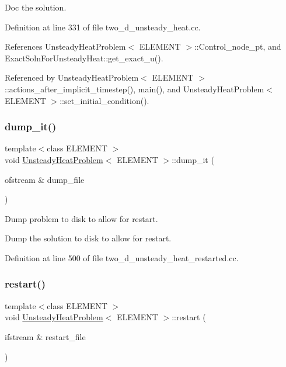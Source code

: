 Doc the solution. 



Definition at line 331 of file two\+\_\+d\+\_\+unsteady\+\_\+heat.\+cc.



References Unsteady\+Heat\+Problem$<$ E\+L\+E\+M\+E\+N\+T $>$\+::\+Control\+\_\+node\+\_\+pt, and Exact\+Soln\+For\+Unsteady\+Heat\+::get\+\_\+exact\+\_\+u().



Referenced by Unsteady\+Heat\+Problem$<$ E\+L\+E\+M\+E\+N\+T $>$\+::actions\+\_\+after\+\_\+implicit\+\_\+timestep(), main(), and Unsteady\+Heat\+Problem$<$ E\+L\+E\+M\+E\+N\+T $>$\+::set\+\_\+initial\+\_\+condition().

\mbox{\label{classUnsteadyHeatProblem_a9a60874a6471414819301705f1a2afd1}} 
\subsubsection{\texorpdfstring{dump\+\_\+it()}{dump\_it()}}
{\footnotesize\ttfamily template$<$class E\+L\+E\+M\+E\+NT $>$ \\
void \hyperlink{classUnsteadyHeatProblem}{Unsteady\+Heat\+Problem}$<$ E\+L\+E\+M\+E\+NT $>$\+::dump\+\_\+it (\begin{DoxyParamCaption}\item[{ofstream \&}]{dump\+\_\+file }\end{DoxyParamCaption})}



Dump problem to disk to allow for restart. 

Dump the solution to disk to allow for restart. 

Definition at line 500 of file two\+\_\+d\+\_\+unsteady\+\_\+heat\+\_\+restarted.\+cc.

\mbox{\label{classUnsteadyHeatProblem_ad0a4a1c1da24f6d62f64b0d40be31709}} 
\subsubsection{\texorpdfstring{restart()}{restart()}}
{\footnotesize\ttfamily template$<$class E\+L\+E\+M\+E\+NT $>$ \\
void \hyperlink{classUnsteadyHeatProblem}{Unsteady\+Heat\+Problem}$<$ E\+L\+E\+M\+E\+NT $>$\+::restart (\begin{DoxyParamCaption}\item[{ifstream \&}]{restart\+\_\+file }\end{DoxyParamCaption})}



